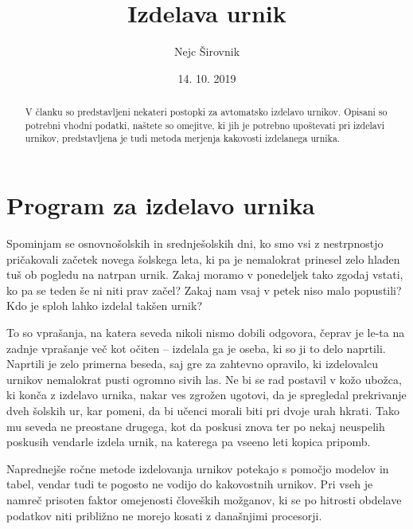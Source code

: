 \documentclass[a4paper,10pt]{article}
\begin{document}


\title{Izdelava urnik}
\author{Nejc Širovnik}
\date{14. 10. 2019}
\maketitle
\makeatother



\begin{abstract}
	V članku so predstavljeni nekateri postopki za avtomatsko izdelavo urnikov. Opisani so
potrebni vhodni podatki, naštete so omejitve, ki jih je potrebno upoštevati pri izdelavi
urnikov, predstavljena je tudi metoda merjenja kakovosti izdelanega urnika.
\end{abstract}

\section{Program za izdelavo urnika} %

Spominjam se osnovnošolskih in srednješolskih dni, ko smo vsi z nestrpnostjo pričakovali
začetek novega šolskega leta, ki pa je nemalokrat prinesel zelo hladen tuš ob pogledu na
natrpan urnik. Zakaj moramo v ponedeljek tako zgodaj vstati, ko pa se teden še ni niti
prav začel? Zakaj nam vsaj v petek niso malo popustili? Kdo je sploh lahko izdelal
takšen urnik?

To so vprašanja, na katera seveda nikoli nismo dobili odgovora, čeprav je le-ta na zadnje
vprašanje več kot očiten -- izdelala ga je oseba, ki so ji to delo naprtili. Naprtili je
zelo primerna beseda, saj gre za zahtevno opravilo, ki izdelovalcu urnikov nemalokrat
pusti ogromno sivih las. Ne bi se rad postavil v kožo ubožca, ki konča z izdelavo urnika,
nakar ves zgrožen ugotovi, da je spregledal prekrivanje dveh šolskih ur, kar pomeni, da
bi učenci morali biti pri dvoje urah hkrati. Tako mu seveda ne preostane drugega, kot da
poskusi znova ter po nekaj neuspelih poskusih vendarle izdela urnik, na katerega pa vseeno
leti kopica pripomb.

Naprednejše ročne metode izdelovanja urnikov potekajo s pomočjo modelov in tabel, vendar
tudi te pogosto ne vodijo do kakovostnih urnikov. Pri vseh je namreč prisoten faktor
omejenosti človeških možganov, ki se po hitrosti obdelave podatkov niti približno ne
morejo kosati z današnjimi procesorji.
\end{document}
